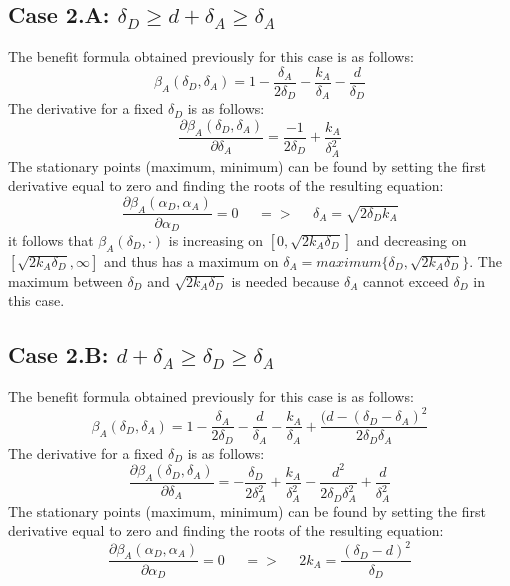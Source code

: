 \subsection*{Case 2.A: $\delta_{D} \geq d+\delta_{A} \geq \delta_{A} $ }
The benefit formula obtained previously for this case is as follows:
\begin{equation*}
\beta_{A}(\delta_{D},\delta_{A}) =1- \dfrac{\delta_{A}}{2\delta_{D}} - \dfrac{k_{A}}{\delta_{A}} - \dfrac{d}{\delta_{D}}
\end{equation*}
The derivative for a fixed $\delta_{D}$ is as follows:
\begin{equation*}
\dfrac{\partial \beta_{A}(\delta_{D},\delta_{A})}{\partial \delta_{A}} = \dfrac{-1}{2\delta_{D}} + \dfrac{k_{A}}{\delta_{A}^{2}}
\end{equation*}
The stationary points (maximum, minimum) can be found by setting the first derivative equal to zero and finding the roots of the resulting equation:
\begin{equation*}
\frac{\partial \beta_{A}(\alpha_{D},\alpha_{A})}{\partial \alpha_{D}} =0 ~~~~~~ =>~~~~~~ \delta_{A} = \sqrt{2\delta_{D}k_{A}}
\end{equation*}
it follows that $\beta_{A}(\delta_{D},\cdot)$ is increasing on $[0,\sqrt{2k_{A}\delta_{D}}]$ and decreasing on $[\sqrt{2k_{A}\delta_{D}}, \infty]$ and thus has a maximum on $\delta_{A} = maximum \{\delta_{D}, \sqrt{2k_{A}\delta_{D}} \} $. The maximum between $\delta_{D}$ and $ \sqrt{2k_{A}\delta_{D}}$ is needed because $\delta_{A} $ cannot exceed $\delta_{D}$ in this case. \\

\subsection*{Case 2.B: $d+\delta_{A} \geq \delta_{D} \geq  \delta_{A} $} 

The benefit formula obtained previously for this case is as follows: 
\begin{equation*}
\beta_{A}(\delta_{D},\delta_{A}) = 1 - \dfrac{\delta_{A}}{2\delta_{D}} - \dfrac{d}{\delta_{A}} - \dfrac{k_{A}}{\delta_{A}} + \dfrac{(d-(\delta_{D}-\delta_{A})^{2}}{2\delta_{D}\delta_{A}} 
\end{equation*}
The derivative for a fixed $\delta_{D}$ is as follows:
\begin{equation*}
\dfrac{\partial \beta_{A}(\delta_{D},\delta_{A})}{\partial \delta_{A}} = -\dfrac{\delta_{D}}{2\delta_{A}^{2}} + \dfrac{k_{A}}{\delta_{A}^{2}} - \dfrac{d^{2}}{2\delta_{D}\delta_{A}^{2}} + \dfrac{d}{\delta_{A}^{2}}
\end{equation*}
The stationary points (maximum, minimum) can be found by setting the first derivative equal to zero and finding the roots of the resulting equation:
\begin{equation*}
\frac{\partial \beta_{A}(\alpha_{D},\alpha_{A})}{\partial \alpha_{D}} =0 ~~~~~~ =>~~~~~~ 2k_{A} = \dfrac{(\delta_{D}-d)^{2}}{\delta_{D}}
\end{equation*}

